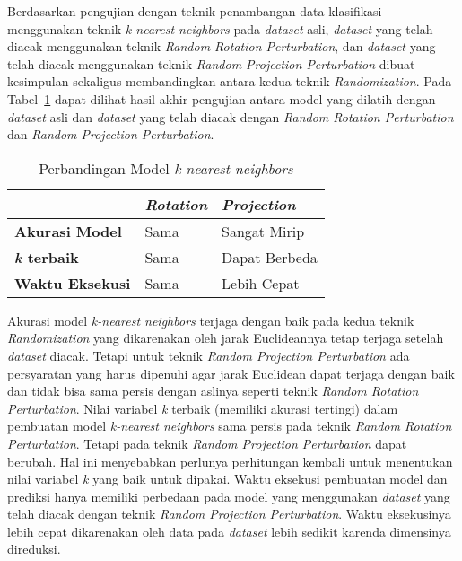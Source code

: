 Berdasarkan pengujian dengan teknik penambangan data klasifikasi menggunakan teknik \textit{k-nearest neighbors} pada \textit{dataset} asli, \textit{dataset} yang telah diacak menggunakan teknik \textit{Random Rotation Perturbation}, dan \textit{dataset} yang telah diacak menggunakan teknik \textit{Random Projection Perturbation} dibuat kesimpulan sekaligus membandingkan antara kedua teknik \textit{Randomization}. Pada Tabel~\ref{table:perbandingan-klasifikasi} dapat dilihat hasil akhir pengujian antara model yang dilatih dengan \textit{dataset} asli dan \textit{dataset} yang telah diacak dengan \textit{Random Rotation Perturbation} dan \textit{Random Projection Perturbation}.

\begin{table}
	\centering
	\caption{Perbandingan Model \textit{k-nearest neighbors}}
	\begin{tabular}{|l|l|l|}
		\hline
		& \textbf{\textit{Rotation}} & \textbf{\textit{Projection}} \\ \hline
		\textbf{Akurasi Model} & Sama & Sangat Mirip \\
		\textbf{\textit{k} terbaik} & Sama & Dapat Berbeda \\
		\textbf{Waktu Eksekusi} & Sama & Lebih Cepat \\
		\hline
	\end{tabular}
	\label{table:perbandingan-klasifikasi}
\end{table}

Akurasi model \textit{k-nearest neighbors} terjaga dengan baik pada kedua teknik \textit{Randomization} yang dikarenakan oleh jarak Euclideannya tetap terjaga setelah \textit{dataset} diacak. Tetapi untuk teknik \textit{Random Projection Perturbation} ada persyaratan yang harus dipenuhi agar jarak Euclidean dapat terjaga dengan baik dan tidak bisa sama persis dengan aslinya seperti teknik \textit{Random Rotation Perturbation}. Nilai variabel \textit{k} terbaik (memiliki akurasi tertingi) dalam pembuatan model \textit{k-nearest neighbors} sama persis pada teknik \textit{Random Rotation Perturbation}. Tetapi pada teknik \textit{Random Projection Perturbation} dapat berubah. Hal ini menyebabkan perlunya perhitungan kembali untuk menentukan nilai variabel \textit{k} yang baik untuk dipakai. Waktu eksekusi pembuatan model dan prediksi hanya memiliki perbedaan pada model yang menggunakan \textit{dataset} yang telah diacak dengan teknik \textit{Random Projection Perturbation}. Waktu eksekusinya lebih cepat dikarenakan oleh data pada \textit{dataset} lebih sedikit karenda dimensinya direduksi.

